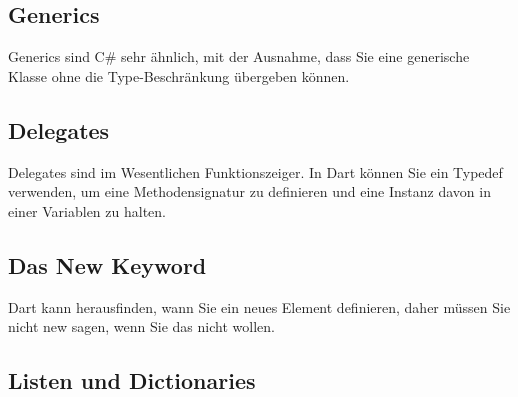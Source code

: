 \begin{minipage}{\linewidth}

\end{minipage}


\subsection{Generics}

Generics sind C\# sehr ähnlich, mit der Ausnahme, dass Sie eine generische Klasse ohne die Type-Beschränkung übergeben können.

\begin{minipage}{\linewidth}

\end{minipage}

\subsection{Delegates}

Delegates sind im Wesentlichen Funktionszeiger. In Dart können Sie ein Typedef verwenden, um eine Methodensignatur zu definieren und eine Instanz davon in einer Variablen zu halten.


\begin{minipage}{\linewidth}

\end{minipage}

\subsection{Das New Keyword}


Dart kann herausfinden, wann Sie ein neues Element definieren, daher müssen Sie nicht new sagen, wenn Sie das nicht wollen.

\begin{minipage}{\linewidth}

\end{minipage}


\subsection{Listen und Dictionaries}

